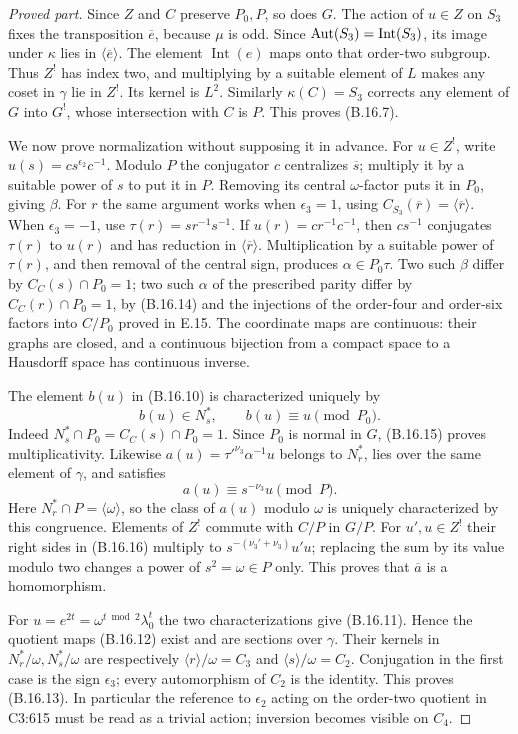 \begin{proof}[Proved part]
Since $Z$ and $C$ preserve $P_0,P$, so does $G$. The action of
$u\in Z$ on $S_3$ fixes the transposition $\overline e$, because
$\mu$ is odd. Since $\operatorname{Aut}(S_3)=\operatorname{Int}(S_3)$, its
image under $\kappa$ lies in $\langle\overline e\rangle$.
The element $\operatorname{Int}(e)$ maps onto that order-two
subgroup. Thus $Z^!$ has index two, and multiplying by a suitable
element of $L$ makes any coset in $\gamma$ lie in $Z^!$.
Its kernel is $L^2$. Similarly $\kappa(C)=S_3$ corrects any
element of $G$ into $G^!$, whose intersection with $C$ is $P$.
This proves (B.16.7).

We now prove normalization without supposing it in advance.
For $u\in Z^!$, write $u(s)=c s^{\epsilon_2}c^{-1}$.
Modulo $P$ the conjugator $c$ centralizes $\overline s$;
multiply it by a suitable power of $s$ to put it in $P$.
Removing its central $\omega$-factor puts it in $P_0$, giving
$\beta$. For $r$ the same argument works when $\epsilon_3=1$,
using $C_{S_3}(\overline r)=\langle\overline r\rangle$.
When $\epsilon_3=-1$, use
$\tau(r)=sr^{-1}s^{-1}$. If $u(r)=cr^{-1}c^{-1}$,
then $cs^{-1}$ conjugates $\tau(r)$ to $u(r)$ and has reduction
in $\langle\overline r\rangle$. Multiplication by a suitable
power of $\tau(r)$, and then removal of the central sign,
produces $\alpha\in P_0\tau$.
Two such $\beta$ differ by $C_C(s)\cap P_0=1$; two such
$\alpha$ of the prescribed parity differ by
$C_C(r)\cap P_0=1$, by (B.16.14) and the injections of the
order-four and order-six factors into $C/P_0$ proved in E.15.
The coordinate maps are continuous: their graphs are closed,
and a continuous bijection from a compact space to a Hausdorff
space has continuous inverse.

The element $b(u)$ in (B.16.10) is characterized uniquely by
\[
             b(u)\in N_s^*,\qquad b(u)\equiv u\pmod {P_0}.
 \tag{B.16.15}
\]
Indeed $N_s^*\cap P_0=C_C(s)\cap P_0=1$.
Since $P_0$ is normal in $G$, (B.16.15) proves multiplicativity.
Likewise $a(u)=\tau'^{\nu_3}\alpha^{-1}u$ belongs to $N_r^*$,
lies over the same element of $\gamma$, and satisfies
\[
                   a(u)\equiv s^{-\nu_3}u\pmod P.
 \tag{B.16.16}
\]
Here $N_r^*\cap P=\langle\omega\rangle$, so the class of
$a(u)$ modulo $\omega$ is uniquely characterized by this
congruence. Elements of $Z^!$ commute with $C/P$ in $G/P$.
For $u',u\in Z^!$ their right sides in (B.16.16) multiply to
$s^{-(\nu_3'+\nu_3)}u'u$; replacing the sum by its value modulo
two changes a power of $s^2=\omega\in P$ only.
This proves that $\overline a$ is a homomorphism.

For $u=e^{2t}=\omega^{t\bmod2}\lambda_0^t$ the two
characterizations give (B.16.11). Hence the quotient maps
(B.16.12) exist and are sections over $\gamma$.
Their kernels in $N_r^*/\omega,N_s^*/\omega$ are respectively
$\langle r\rangle/\omega=C_3$ and
$\langle s\rangle/\omega=C_2$. Conjugation in the first case
is the sign $\epsilon_3$; every automorphism of $C_2$ is the
identity. This proves (B.16.13). In particular the reference to
$\epsilon_2$ acting on the order-two quotient in C3:615 must
be read as a trivial action; inversion becomes visible on $C_4$.
\end{proof}

